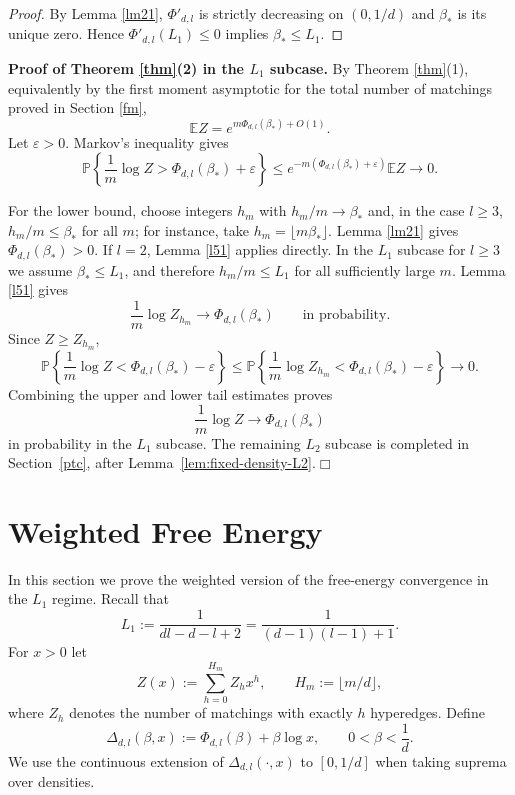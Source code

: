 \documentclass[11pt]{amsart}
\theoremstyle{plain}
\numberwithin{equation}{section}
\numberwithin{theorem}{section}
\numberwithin{figure}{section}
\begin{document}
\begin{proof}
By Lemma \ref{lm21}, $\Phi'_{d,l}$ is strictly decreasing on $(0,1/d)$ and
$\beta_*$ is its unique zero.  Hence $\Phi'_{d,l}(L_1)\le0$ implies
$\beta_*\le L_1$.
\end{proof}

\noindent\textbf{Proof of Theorem \ref{thm}(2) in the $L_1$ subcase.}
By Theorem \ref{thm}(1), equivalently by the first moment asymptotic for the total
number of matchings proved in Section \ref{fm},
\begin{equation}\label{eq:section5-total-first-moment}
  \mathbb E Z=e^{m\Phi_{d,l}(\beta_*)+O(1)}.
\end{equation}
Let $\varepsilon>0$.  Markov's inequality gives
\[
  \mathbb P\left\{\frac1m\log Z>\Phi_{d,l}(\beta_*)+\varepsilon\right\}
  \le e^{-m(\Phi_{d,l}(\beta_*)+\varepsilon)}\mathbb E Z
  \longrightarrow0.
\]

For the lower bound, choose integers $h_m$ with $h_m/m\to\beta_*$ and, in the case
$l\ge3$, $h_m/m\le\beta_*$ for all $m$; for instance, take
$h_m=\lfloor m\beta_*\rfloor$.  Lemma \ref{lm21} gives
$\Phi_{d,l}(\beta_*)>0$.  If $l=2$, Lemma \ref{l51} applies directly.  In the $L_1$ subcase for
$l\ge3$ we assume $\beta_*\le L_1$, and therefore $h_m/m\le L_1$ for all
sufficiently large $m$.  Lemma \ref{l51} gives
\[
  \frac1m\log Z_{h_m}\longrightarrow\Phi_{d,l}(\beta_*)
  \qquad\text{in probability}.
\]
Since $Z\ge Z_{h_m}$,
\[
  \mathbb P\left\{\frac1m\log Z<\Phi_{d,l}(\beta_*)-\varepsilon\right\}
  \le
  \mathbb P\left\{\frac1m\log Z_{h_m}<\Phi_{d,l}(\beta_*)-\varepsilon\right\}
  \longrightarrow0.
\]
Combining the upper and lower tail estimates proves
\[
  \frac1m\log Z\longrightarrow\Phi_{d,l}(\beta_*)
\]
in probability in the $L_1$ subcase.  The remaining $L_2$ subcase is completed
in Section~\ref{ptc}, after Lemma~\ref{lem:fixed-density-L2}.\hfill\(\Box\)






\section{Weighted Free Energy}\label{wfe}

In this section we prove the weighted version of the free-energy convergence in the
$L_1$ regime.  Recall that
\[
  L_1:=\frac1{dl-d-l+2}=\frac1{(d-1)(l-1)+1}.
\]
For $x>0$ let
\[
  Z(x):=\sum_{h=0}^{H_m} Z_h x^h,\qquad H_m:=\lfloor m/d\rfloor,
\]
where $Z_h$ denotes the number of matchings with exactly $h$ hyperedges.  Define
\begin{equation}\label{eq:weighted-Delta}
  \Delta_{d,l}(\beta,x):=\Phi_{d,l}(\beta)+\beta\log x,
  \qquad 0<\beta<\frac1d .
\end{equation}
We use the continuous extension of $\Delta_{d,l}(\cdot,x)$ to $[0,1/d]$ when taking
suprema over densities.
\end{document}
